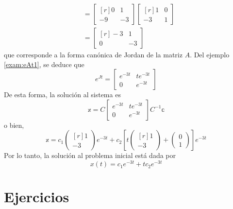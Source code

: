 \begin{example}
\begin{align*}
        & = \begin{bmatrix*}[r]
            0 & 1 \\
            -9 & -3
        \end{bmatrix*} \begin{bmatrix*}[r]
            1 & 0 \\
            -3 & 1
        \end{bmatrix*} \\
        & = \begin{bmatrix*}[r]
            -3 & 1 \\
            0 & -3
        \end{bmatrix*}
    \end{align*}
    que corresponde a la forma canónica de Jordan de la matriz $A$. Del ejemplo \ref{exam:eAt1}, se deduce que
    $$e^{Jt} = \begin{bmatrix}
        e^{-3t} & te^{-3t} \\
        0 & e^{-3t}
    \end{bmatrix}$$
    De esta forma, la solución al sistema es
    $$\mathbb{x} = C \begin{bmatrix}
        e^{-3t} & te^{-3t} \\
        0 & e^{-3t}
    \end{bmatrix} C^{-1} \mathbb{c}$$
    o bien,
    $$\mathbb{x} = c_1 \begin{pmatrix*}[r] 1 \\ -3 \end{pmatrix*} e^{-3t} + c_2 \left[ t\begin{pmatrix*}[r] 1 \\ -3 \end{pmatrix*} + \begin{pmatrix} 0 \\ 1 \end{pmatrix} \right] e^{-3t}$$
    Por lo tanto, la solución al problema inicial está dada por
    $$x(t) = c_1e^{-3t} + tc_2e^{-3t}$$
\end{example}

\newpage

\section{Ejercicios}

